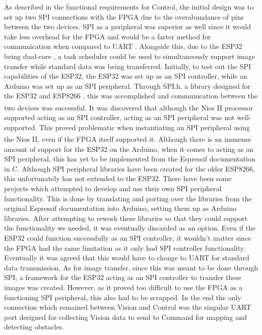 \documentclass[a4paper]{article}
\begin{document}
As described in the functional requirements for Control, the initial 
design was to set up two SPI connections with the FPGA due to the 
overabundance of pins between the two devices. SPI as a peripheral was 
superior as well since it would take less overhead for the FPGA and 
would be a faster method for communication when compared to UART 
\cite{CommProtocolComp}. Alongside this, due to the ESP32 being dual-core
, a task scheduler \cite{ESP32DualCore} could be used to simultaneously support 
image transfer while standard data was being transferred. Initially, to test out 
the SPI capabilities of the ESP32, the ESP32 was set up as an SPI controller, 
while an Arduino was set up as an SPI peripheral. Through SPI.h, 
a library designed for the ESP32 and ESP8266 \cite{ESP32ArduinoGithub}, 
this was accomplished and communication between the two 
devices was successful. It was discovered that although the Nios\textsuperscript{\textregistered} II processor 
supported acting as an SPI controller, acting as an SPI peripheral was not 
well-supported. This proved problematic when instantiating an SPI peripheral 
using the Nios\textsuperscript{\textregistered} II, even if the FPGA itself supported it. Although there is an 
immense amount of support for the ESP32 on the Arduino, when it comes 
to acting as an SPI peripheral, this has yet to be implemented from the 
Espressif documentation in C. Although SPI peripheral libraries have 
been created for the older ESP8266, this unfortunately has not extended 
to the ESP32. There have been some projects which attempted to develop 
and use their own SPI peripheral functionality. This is done by 
translating and porting over the libraries from the original Espressif 
documentation into Arduino, setting them up as Arduino libraries. 
After attempting to rework these libraries \cite{ESPSPISlaveMaster} \cite{ESPSPISlave}so that they could support 
the functionality we needed, it was eventually discarded as an option. 
Even if the ESP32 could function successfully as an SPI controller, 
it wouldn’t matter since the FPGA had the same limitation as it only 
had SPI controller functionality. Eventually it was agreed that this 
would have to change to UART for standard data transmission. 
As for image transfer, since this was meant to be done through SPI, a 
framework for the ESP32 acting as an SPI controller to transfer these 
images was created. However, as it proved too difficult to use the FPGA 
as a functioning SPI peripheral, this also had to be scrapped. In the 
end the only connection which remained between Vision and Control was 
the singular UART port designed for collecting Vision data to send to 
Command for mapping and detecting obstacles.
\end{document}
